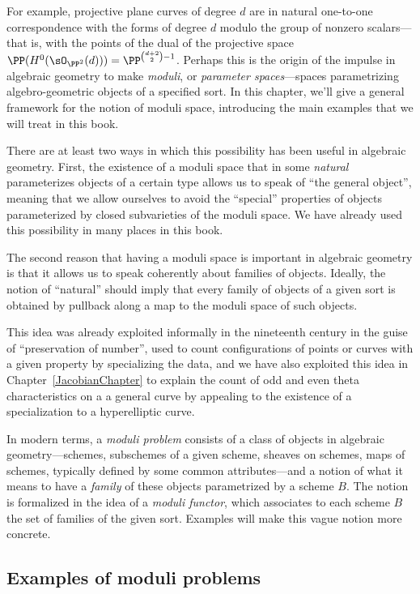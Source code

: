 For example, projective plane curves of degree $d$
are in natural one-to-one correspondence with the forms of degree $d$ modulo the group of nonzero scalars---that is, with the points of the dual of the projective space
$ \PP(H^0(\sO_{\PP^2}(d)))=\PP^{\binom{d+2}{2}-1} $.
Perhaps this is the origin of the impulse in algebraic geometry to make 
 \emph{moduli}, or \emph{parameter spaces}---spaces parametrizing algebro-geometric objects of a specified sort. In this chapter, we'll give a general framework for the notion of moduli space, introducing the main examples that we will treat in this book.

There are at least two ways in which this possibility has been useful in algebraic geometry. First, the existence of a moduli space that in some \emph{natural} parameterizes objects of a certain type allows us to speak of ``the general object'', meaning that we allow ourselves to avoid the ``special'' properties of objects parameterized by closed subvarieties of the moduli space. We have already used this
possibility in many places in this book. 

The second reason that having a moduli space is important in algebraic geometry is that it allows us to speak coherently about
families of objects. Ideally, the notion of ``natural'' should imply that every family of objects of a given sort
is obtained by pullback along a map to the moduli space of such objects. 

This idea was already exploited informally in the nineteenth century in the guise of ``preservation of number'', used to count configurations of points or curves with a given property by specializing the 
data, and we have also exploited this idea in
Chapter~\ref{JacobianChapter} to explain the count of odd and even theta characteristics on a a general curve by appealing to the existence of a specialization to a hyperelliptic curve.

In modern terms, a \emph{moduli problem} consists of a class of objects in algebraic geometry---schemes, subschemes of a given scheme, sheaves on schemes, maps of schemes, typically defined by some common attributes---and a notion of what it means to have a \emph{family} of these objects parametrized by a scheme $B$. The notion is formalized in the idea of a \emph{moduli functor}, 
which associates to each scheme $B$ the set of families of the given sort. Examples will make this vague notion more concrete.

\subsection{Examples of moduli problems}

